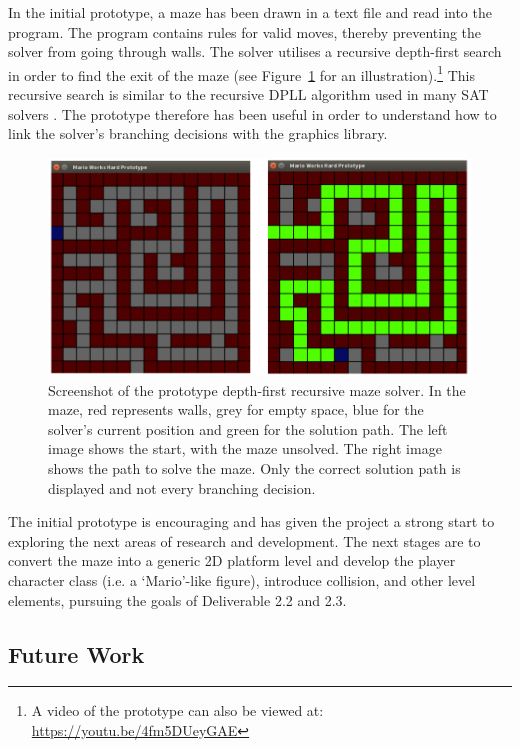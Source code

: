 \documentclass[a4paper]{article}
\begin{document}
In the initial prototype, a maze has been drawn in a text file and read into the program. The
program contains rules for valid moves, thereby preventing the solver from going through walls. The
solver utilises a recursive depth-first search in order to find the exit of the maze (see
Figure~\ref{prototype} for an illustration).\footnote{A video of the prototype can also be viewed
at: \url{ https://youtu.be/4fm5DUeyGAE}} This recursive search is similar to the recursive DPLL
algorithm used in many SAT solvers \cite{zhang2002quest,gomes2008satisfiability}. The prototype
therefore has been useful in order to understand how to link the solver's branching decisions with
the graphics library.

\begin{figure}[h!]
  
  \centering
    \includegraphics[scale=0.35]{compare}
  \caption{Screenshot of the prototype depth-first recursive maze solver. In the maze, red represents walls, grey for empty space, blue for the solver's current position and green for the solution path. The left image shows the start, with the maze unsolved. The right image shows the path to solve the maze. Only the correct solution path is displayed and not every branching decision.}
  \label{prototype}
\end{figure}

The initial prototype is encouraging and has given the project a strong start to exploring the next
areas of research and development. The next stages are to convert the maze into a generic 2D
platform level and develop the player character class (i.e. a `Mario'-like figure), introduce
collision, and other level elements, pursuing the goals of Deliverable 2.2 and 2.3.

\subsection{Future Work}
\end{document}

